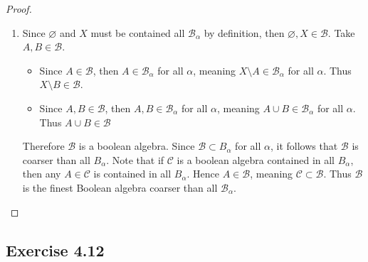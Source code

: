 \documentclass[hw_all.tex]{subfiles}
\begin{document}
\begin{proof}
\begin{enumerate}
            Suppose that the Lebesgue algebra (which is just the collection of all Lebesgue measurable sets) was atomic. Note that there must be an atom $A$ such that $|A| \geq 2$. If not, then each atom would be a singleton and thus generate the discrete algebra, which does not equal the Lebesgue algebra. Note that $A$ must be Lebesgue measurable, and since $\qty{x}$ is also Lebesgue measurable, $A \setminus \qty{x}$ is also Lebesgue measurable. But since $A \setminus \qty{x} \subset A$, then $A$ cannot be an atom, a contradiction. Therefore the Lebesgue algebra is not atomic

            The same argument above holds for the null algebra since the Lebesgue measure of a singleton is $0$. Hence the null algebra is not atomic.

        \item 
            Since $\varnothing$ and $X$ must be contained all $\mathcal{B}_{\alpha}$ by definition, then $\varnothing, X \in \mathcal{B}$. Take $A, B \in \mathcal{B}$.
            \begin{itemize}
                \item
                    Since $A \in \mathcal{B}$, then $A \in \mathcal{B}_{\alpha}$ for all $\alpha$, meaning $X \setminus A \in \mathcal{B}_{\alpha}$ for all $\alpha$. Thus $X \setminus B \in \mathcal{B}$.

                \item 
                    Since $A, B \in \mathcal{B}$, then $A,B \in \mathcal{B}_{\alpha}$ for all $\alpha$, meaning $A \cup B \in \mathcal{B}_{\alpha}$ for all $\alpha$. Thus $A \cup B \in \mathcal{B}$
            \end{itemize}
            Therefore $\mathcal{B}$ is a boolean algebra. Since $\mathcal{B} \subset B_{\alpha}$ for all $\alpha$, it follows that $\mathcal{B}$ is coarser than all $B_{\alpha}$. Note that if $\mathcal{C}$ is a boolean algebra contained in all $B_{\alpha}$, then any $A \in \mathcal{C}$ is contained in all $B_{\alpha}$. Hence $A \in \mathcal{B}$, meaning $\mathcal{C} \subset \mathcal{B}$. Thus $\mathcal{B}$ is the finest Boolean algebra coarser than all $\mathcal{B}_{\alpha}$.
    \end{enumerate}
\end{proof}

\subsection{Exercise 4.12}
\end{document}
